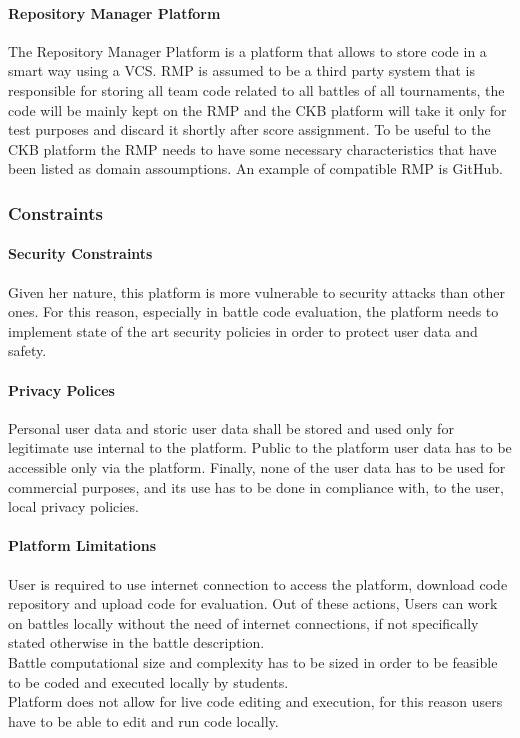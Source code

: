 \paragraph{Repository Manager Platform}
The Repository Manager Platform is a platform that allows to store code in a smart way using a VCS.
RMP is assumed to be a third party system that is responsible for storing all team code related to all battles of all tournaments, the code will be mainly kept on the RMP and the CKB platform will take it only for test purposes and discard it shortly after score assignment. 
To be useful to the CKB platform the RMP needs to have some necessary characteristics that have been listed as domain assoumptions.
An example of compatible RMP is GitHub.

\subsubsection{Constraints}
\paragraph{Security Constraints}
Given her nature, this platform is more vulnerable to security attacks than other ones. For this reason, especially in battle code evaluation, the platform needs to implement state of the art security policies in order to protect user data and safety.
\paragraph{Privacy Polices}
Personal user data and storic user data shall be stored and used only for legitimate use internal to the platform. Public to the platform user data has to be accessible only via the platform. Finally, none of the user data has to be used for commercial purposes, and its use has to be done in compliance with, to the user, local privacy policies. 
\paragraph{Platform Limitations}
User is required to use internet connection to access the platform, download code repository and upload code for evaluation. Out of these actions, Users can work on battles locally without the need of internet connections, if not specifically stated otherwise in the battle description.\\
Battle computational size and complexity has to be sized in order to be feasible to be coded and executed locally by students.\\
Platform does not allow for live code editing and execution, for this reason users have to be able to edit and run code locally.
